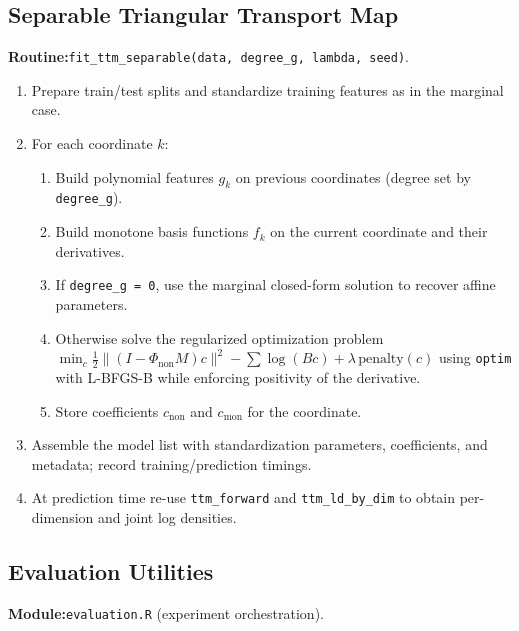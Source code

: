 \documentclass[11pt,a4paper,twoside]{book}\usepackage[]{graphicx}\usepackage[]{xcolor}
\begin{document}
\subsection{Separable Triangular Transport Map}\label{app:ttm-sep}

\textbf{Routine:}\quad\texttt{fit\_ttm\_separable(data, degree\_g, lambda, seed)}.

\begin{enumerate}
  \item Prepare train/test splits and standardize training features as in the marginal case.
  \item For each coordinate $k$:
    \begin{enumerate}
      \item Build polynomial features $g_k$ on previous coordinates (degree set by \texttt{degree\_g}).
      \item Build monotone basis functions $f_k$ on the current coordinate and their derivatives.
      \item If \texttt{degree\_g = 0}, use the marginal closed-form solution to recover affine parameters.
      \item Otherwise solve the regularized optimization problem
            $\min_c \frac{1}{2}\lVert (I - \Phi_{\text{non}} M)c \rVert^2 - \sum \log (B c) + \lambda\,\text{penalty}(c)$
            using \texttt{optim} with L-BFGS-B while enforcing positivity of the derivative.
      \item Store coefficients $c_{\text{non}}$ and $c_{\text{mon}}$ for the coordinate.
    \end{enumerate}
  \item Assemble the model list with standardization parameters, coefficients, and metadata; record training/prediction timings.
  \item At prediction time re-use \texttt{ttm\_forward} and \texttt{ttm\_ld\_by\_dim} to obtain per-dimension and joint log densities.
\end{enumerate}

\subsection{Evaluation Utilities}\label{app:evaluation}

\textbf{Module:}\quad\texttt{evaluation.R} (experiment orchestration).
\end{document}
